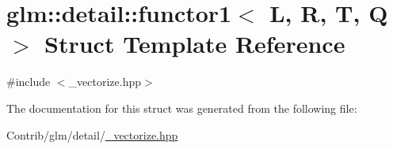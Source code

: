 \hypertarget{structglm_1_1detail_1_1functor1}{}\section{glm\+:\+:detail\+:\+:functor1$<$ L, R, T, Q $>$ Struct Template Reference}
\label{structglm_1_1detail_1_1functor1}


{\ttfamily \#include $<$\+\_\+vectorize.\+hpp$>$}



The documentation for this struct was generated from the following file\+:\begin{DoxyCompactItemize}
\item 
Contrib/glm/detail/\mbox{\hyperlink{__vectorize_8hpp}{\+\_\+vectorize.\+hpp}}\end{DoxyCompactItemize}
